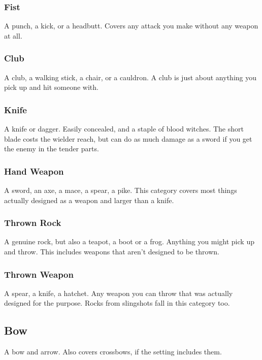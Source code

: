 \subsubsection{Fist}
A punch, a kick, or a headbutt.
Covers any attack you make without any weapon at all.

\subsubsection{Club}
A club, a walking stick, a chair, or a cauldron.
A club is just about anything you pick up and hit someone with.

\subsubsection{Knife}
A knife or dagger.
Easily concealed, and a staple of blood witches.
The short blade costs the wielder reach, but can do as much damage as a sword if you get the enemy in the tender parts.

\subsubsection{Hand Weapon}
A sword, an axe, a mace, a spear, a pike.
This category covers most things actually designed as a weapon and larger than a knife.

\subsubsection{Thrown Rock}
A genuine rock, but also a teapot, a boot or a frog.
Anything you might pick up and throw.
This includes weapons that aren't designed to be thrown.

\subsubsection{Thrown Weapon}
A spear, a knife, a hatchet.
Any weapon you can throw that was actually designed for the purpose.
Rocks from slingshots fall in this category too.

\subsection{Bow}
A bow and arrow.
Also covers crossbows, if the setting includes them.
